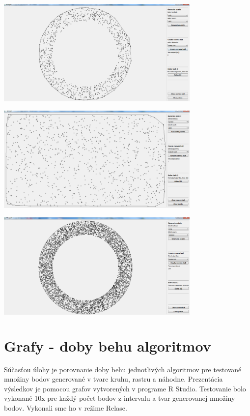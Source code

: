\documentclass[12pt]{article}
\begin{document}
\begin{center}
   \includegraphics[width=10cm]{./img/CH_points_generate_circle_1000.png}
\end{center}

\begin{center}
   \includegraphics[width=10cm]{./img/CH_points_generate_random_1000.png}
\end{center}
\clearpage
\begin{center}
   \includegraphics[width=10cm]{./img/milion_points.png}
\end{center}

\clearpage 
\section{Grafy - doby behu algoritmov}
Súčasťou úlohy je porovnanie doby behu jednotlivých algoritmov pre testované množiny bodov generované v tvare kruhu, rastru a náhodne. Prezentácia výsledkov je pomocou grafov vytvorených v programe R Studio. Testovanie bolo vykonané 10x pre každý počet bodov z intervalu a tvar generovanej množiny bodov. Vykonali sme ho v režime Relase.
\end{document}
